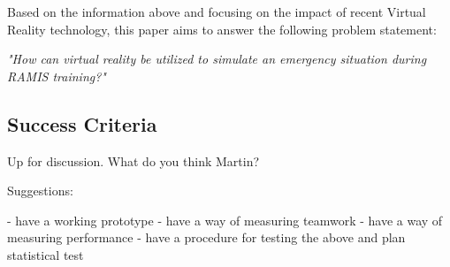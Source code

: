 Based on the information above and focusing on the impact of recent Virtual Reality technology, this paper aims to answer the following problem statement:\\

\begin{center}
\emph{\textit{"How can virtual reality be utilized to simulate an emergency situation during RAMIS training?"}}
\end{center}


\subsection*{Success Criteria}

Up for discussion. What do you think Martin? 

Suggestions: 

- have a working prototype
- have a way of measuring teamwork
- have a way of measuring performance
- have a procedure for testing the above and plan statistical test
